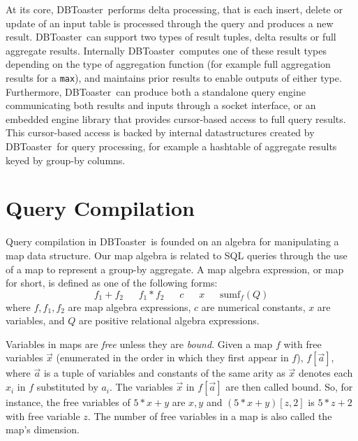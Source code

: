 \documentclass{vldb}
\newcommand{\comment}[1]{}
\newcommand{\compiler}{DBToaster}
\begin{document}
{At its core, \compiler\ performs delta processing, that is each insert, delete or
update of an input table is processed through the query and produces a new
result. \compiler\ can support two types of result tuples, delta results or full
aggregate results. Internally \compiler\ computes one of these result types
depending on the type of aggregation function (for example full aggregation
results for a \texttt{max}), and maintains prior results to enable outputs of
either type. Furthermore, \compiler\ can produce both a standalone query engine
communicating both results and inputs through a socket interface, or an embedded
engine library that provides cursor-based access to full query results. This
cursor-based access is backed by internal datastructures created by \compiler\
for query processing, for example a hashtable of aggregate results keyed by
group-by columns.
}

\comment{
Figure~\ref{fig:demo-arch} illustrates the \compiler\ architecture.}


\section{Query Compilation}

\def\algsum{\mathrm{sum}}
\def\algagg{\mathrm{agg}}
\def\algtop{\mathrm{top}}
\def\algtopk{\mathrm{topk}}

\def\algsumr{\mbox{sumr}}
\def\algsumf{\mbox{sumf}}
\def\distinct{\mbox{distinct}}
\def\routerjoin{\bowtie\!=}

Query compilation in \compiler\ is founded on an algebra for manipulating a map
data structure. Our map algebra is related to SQL queries through the use of a
map to represent a group-by aggregate. A map algebra expression, or map for
short, is defined as one of the following forms:
\[
f_1 + f_2
\quad\;\;
f_1 * f_2
\quad\;\;
c
\quad\;\;
x
\quad\;\;
\algsumf_f(Q)
\]
where $f, f_1, f_2$ are map algebra expressions, $c$ are numerical constants,
$x$ are variables, and $Q$ are positive relational algebra
expressions.

Variables in maps are {\em free} unless they are {\em bound}. Given a map $f$
with free variables $\vec{x}$ (enumerated in the order in which they first appear
in $f$), $f[\vec{a}]$, where $\vec{a}$ is a tuple of variables and constants of
the same arity as $\vec{x}$ denotes each $x_i$ in $f$ substituted by $a_i$. The
variables $\vec{x}$ in $f[\vec{a}]$ are then called bound. So, for instance, the
free variables of $5 * x + y$ are $x,y$ and $(5 * x + y)[z, 2]$ is $5 * z + 2$
with free variable $z$. The number of free variables in a map is also called the
map's dimension.
\end{document}
